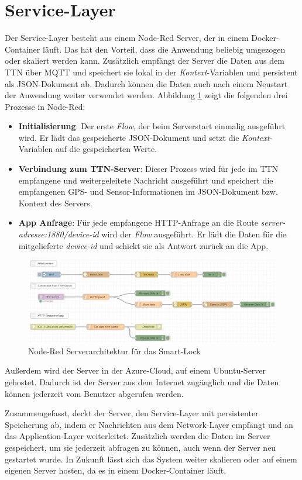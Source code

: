 
\section{Service-Layer}
Der Service-Layer besteht aus einem Node-Red Server, der in einem Docker-Container läuft. Das hat den Vorteil, dass die Anwendung beliebig umgezogen oder skaliert werden kann. Zusätzlich empfängt der Server die Daten aus dem \ac{TTN} über \ac{MQTT} und speichert sie lokal in der \emph{Kontext}-Variablen und persistent als \ac{JSON}-Dokument ab. Dadurch können die Daten auch nach einem Neustart der Anwendung weiter verwendet werden. Abbildung \ref{fig:node-red} zeigt die folgenden drei Prozesse in Node-Red:

\begin{itemize}
    \item \textbf{Initialisierung}: Der erste \emph{Flow}, der beim Serverstart einmalig ausgeführt wird. Er lädt das gespeicherte \ac{JSON}-Dokument und setzt die \emph{Kontext}-Variablen auf die gespeicherten Werte.
    \item \textbf{Verbindung zum \ac{TTN}-Server}: Dieser Prozess wird für jede im \ac{TTN} empfangene und weitergeleitete Nachricht ausgeführt und speichert die empfangenen \ac{GPS}- und Sensor-Informationen im \ac{JSON}-Dokument bzw. Kontext des Servers.
    \item \textbf{App Anfrage}: Für jede empfangene \ac{HTTP}-Anfrage an die Route \emph{server-adresse:1880/device-id} wird der \emph{Flow} ausgeführt. Er lädt die Daten für die mitgelieferte \emph{device-id} und schickt sie als Antwort zurück an die App.
\end{itemize}

\begin{figure}[!htbp]
    \centering
    \includegraphics[width=1\linewidth]{images/node-red.jpg}
    \caption[Node-Red Serverarchitektur für das Smart-Lock]{Node-Red Serverarchitektur für das Smart-Lock}
    \label{fig:node-red}
\end{figure}

Außerdem wird der Server in der Azure-Cloud, auf einem Ubuntu-Server gehostet. Dadurch ist der Server aus dem Internet zugänglich und die Daten können jederzeit vom Benutzer abgerufen werden.

Zusammengefasst, deckt der Server, den Service-Layer mit persistenter Speicherung ab, indem er Nachrichten aus dem Network-Layer empfängt und an das Application-Layer weiterleitet. Zusätzlich werden die Daten im Server gespeichert, um sie jederzeit abfragen zu können, auch wenn der Server neu gestartet wurde. In Zukunft lässt sich das System weiter skalieren oder auf einem eigenen Server hosten, da es in einem Docker-Container läuft.